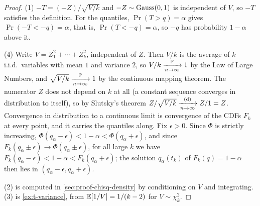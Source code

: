 \begin{proof}
(1) $-T = (-Z)/\sqrt{V/k}$ and $-Z \sim \text{Gauss}(0,1)$ is independent of $V$, so $-T$ satisfies the definition.
For the quantiles, $\Pr(T > q) = \alpha$ gives $\Pr(-T < -q) = \alpha$, that is, $\Pr(T < -q) = \alpha$, so $-q$ has probability $1 - \alpha$ above it.

(4) Write $V = Z_1^2 + \cdots + Z_k^2$, independent of $Z$.
Then $V/k$ is the average of $k$ i.i.d.\ variables with mean $1$ and variance $2$, so $V/k \xrightarrow [n \to \infty ]{\mathbb{P}} 1$ by the Law of Large Numbers, and $\sqrt{V/k} \xrightarrow [n \to \infty ]{\mathbb{P}} 1$ by the continuous mapping theorem.
The numerator $Z$ does not depend on $k$ at all (a constant sequence converges in distribution to itself), so by Slutsky's theorem $Z/\sqrt{V/k} \xrightarrow [n \to \infty ]{\text{(d)}} Z/1 = Z$.
Convergence in distribution to a continuous limit is convergence of the CDFs $F_k$ at every point, and it carries the quantiles along. Fix $\epsilon > 0$. Since $\Phi$ is strictly increasing, $\Phi(q_\alpha - \epsilon) < 1 - \alpha < \Phi(q_\alpha + \epsilon)$, and since $F_k(q_\alpha \pm \epsilon) \to \Phi(q_\alpha \pm \epsilon)$, for all large $k$ we have $F_k(q_\alpha - \epsilon) < 1 - \alpha < F_k(q_\alpha + \epsilon)$; the solution $q_\alpha(t_k)$ of $F_k(q) = 1 - \alpha$ then lies in $(q_\alpha - \epsilon, q_\alpha + \epsilon)$.

(2) is computed in \cref{sec:proof-chisq-density} by conditioning on $V$ and integrating. (3) is \cref{ex:t-variance}, from $\operatorname*{\mathbb{E}}[1/V] = 1/(k-2)$ for $V \sim \chi^2_k$.
\end{proof}

